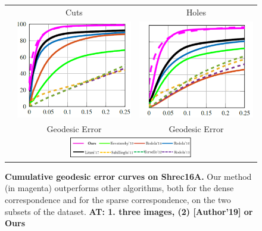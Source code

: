 \documentclass[10pt,twocolumn,letterpaper]{article}
\newcommand{\colornote}[3]{{\color{#1}\bf{#2: #3}\normalfont}}
\newcommand{\colornote}[3]{}
\newcommand {\ayellet}[1]{\colornote{blue}{AT}{#1}}
\begin{document}
\begin{figure}[htb]
	\centering
		\setlength\tabcolsep{0.5pt}
	\begin{tabular}{ccc}
		& Cuts & Holes \\
		\rotatebox{90}{    \, \% Correspondences} &
		\includegraphics[scale=0.35]{figures/SHRECCutsCumulative16.png} & \includegraphics[scale=0.35]{figures/SHRECHolesCumulative16.png} \\
		& Geodesic Error & Geodesic Error\\
		\multicolumn{3}{c}{\includegraphics[width=0.5\textwidth]{figures/SHREC16Amethods.png}}
	\end{tabular}
	\caption{{\bf Cumulative geodesic error curves on Shrec16A.} 
	Our method (in magenta) outperforms other algorithms, both for the dense correspondence and for the sparse correspondence, on the two subsets of the dataset.
	\ayellet{1. three images, (2) [Author'19] or Ours}}
	\label{fig:Shrec16Cumulative}
\end{figure}
\end{document}

